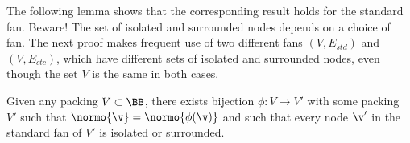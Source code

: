 The following lemma shows that the corresponding result holds for the
standard fan.  Beware!  The set of isolated and surrounded
nodes depends on a choice of fan.  The next proof makes frequent use
of two different fans $(V,E_{std})$ and $(V,E_{ctc})$, which have
different sets of isolated and surrounded nodes, even though the
set $V$ is the same in both cases.



\begin{lemma}[]
\label{lemma:surrounded}  %
Given any packing $V\subset \BB$, there exists bijection $\phi:V\to
V'$ with some packing $V'$ such that $\normo{\v} = \normo{\phi(\v)}$
and such that every node $\v'$ in the standard fan of $V'$ is isolated
or surrounded.  %
\end{lemma}

